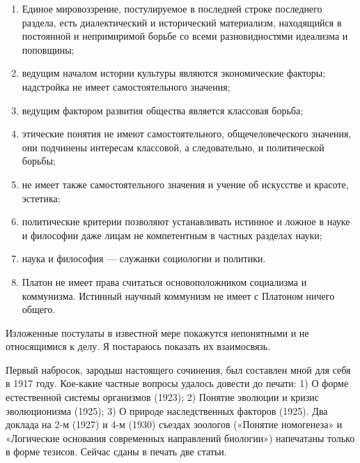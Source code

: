 \begin{enumerate}

  \item Единое мировоззрение, постулируемое в последней строке
        последнего раздела, есть диалектический и исторический
        материализм, находящийся в постоянной и непримиримой борьбе
        со всеми разновидностями идеализма и поповщины;

  \item ведущим началом истории культуры являются экономические
        факторы; надстройка не имеет самостоятельного значения;

  \item ведущим фактором развития общества является классовая
        борьба;

  \item этические понятия не имеют самостоятельного,
        общечеловеческого значения, они подчинены интересам
        классовой, а следовательно, и политической борьбы;

  \item не имеет также самостоятельного значения и учение об
        искусстве и красоте, эстетика;

  \item политические критерии позволяют устанавливать истинное и
        ложное в науке и философии даже лицам не компетентным в
        частных разделах науки;

  \item наука и философия --- служанки социологии и политики.

  \item Платон не имеет права считаться основоположником социализма
        и коммунизма. Истинный научный коммунизм не имеет с Платоном
        ничего общего.

\end{enumerate}

Изложенные постулаты в известной мере покажутся непонятными и не
относящимися к делу. Я постараюсь показать их взаимосвязь.

Первый набросок, зародыш настоящего сочинения, был составлен мной для
себя в 1917 году. Кое-какие частные вопросы удалось довести до печати:
1) О форме естественной системы организмов (1923); 2) Понятие эволюции
и кризис эволюционизма (1925); 3) О природе наследственных факторов
(1925). Два доклада на 2-м (1927) и 4-м (1930) съездах зоологов
(«Понятие номогенеза» и «Логические основания современных направлений
биологии») напечатаны только в форме тезисов. Сейчас сданы в печать
две статьи.


